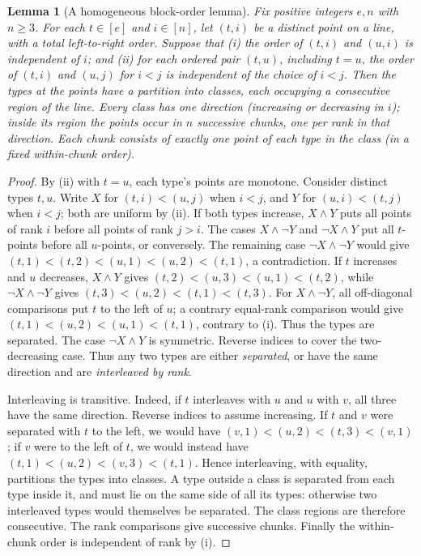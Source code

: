 \documentclass[11pt]{article}
\numberwithin{equation}{section}
\theoremstyle{plain}
\newtheorem{lemma}[theorem]{Lemma}
\theoremstyle{definition}
\theoremstyle{remark}
\theoremstyle{plain}
\begin{document}
\begin{lemma}[A homogeneous block-order lemma]
\label{lem:group-block-order-v82}
Fix positive integers $e,n$ with $n\ge3$.  For each
$t\in[e]$ and $i\in[n]$, let $(t,i)$ be a distinct point
on a line, with a total left-to-right order.  Suppose that
(i) the order of $(t,i)$ and $(u,i)$ is independent of $i$;
and (ii) for each ordered pair $(t,u)$, including $t=u$,
the order of $(t,i)$ and $(u,j)$ for $i<j$ is independent
of the choice of $i<j$.
Then the types at the points have a partition into classes,
each occupying a consecutive region of the line.  Every
class has one direction (increasing or decreasing in $i$);
inside its region the points occur in $n$ successive
\emph{chunks}, one per rank in that direction.  Each
chunk consists of exactly one point of each type in the
class (in a fixed within-chunk order).
\end{lemma}
\begin{proof}
By (ii) with $t=u$, each type's points are monotone.
Consider distinct types $t,u$.  Write
$X$ for $(t,i)<(u,j)$ when $i<j$, and $Y$ for
$(u,i)<(t,j)$ when $i<j$; both are uniform by (ii).
If both types increase, $X\wedge Y$ puts all points
of rank $i$ before all points of rank $j>i$.
The cases $X\wedge\neg Y$ and
$\neg X\wedge Y$ put all $t$-points before all
$u$-points, or conversely.  The remaining case
$\neg X\wedge\neg Y$ would give
$(t,1)<(t,2)<(u,1)<(u,2)<(t,1)$,
a contradiction.  If $t$ increases and $u$ decreases, $X\wedge Y$
gives $(t,2)<(u,3)<(u,1)<(t,2)$, while
$\neg X\wedge\neg Y$ gives
$(t,3)<(u,2)<(t,1)<(t,3)$.
For $X\wedge\neg Y$, all off-diagonal comparisons
put $t$ to the left of $u$; a contrary equal-rank
comparison would give
$(t,1)<(u,2)<(u,1)<(t,1)$,
contrary to (i).  Thus the types are separated.
The case $\neg X\wedge Y$ is symmetric.
Reverse indices
to cover the two-decreasing case.  Thus any two
types are either \emph{separated}, or have the
same direction and are \emph{interleaved by rank}.

Interleaving is transitive.  Indeed, if $t$ interleaves
with $u$ and $u$ with $v$, all three have the same
direction.  Reverse indices to assume increasing.
If $t$ and $v$ were separated with $t$ to the left,
we would have
$(v,1)<(u,2)<(t,3)<(v,1)$;
if $v$ were to the left of $t$, we would instead
have $(t,1)<(u,2)<(v,3)<(t,1)$.
Hence interleaving, with equality, partitions
the types into classes.  A type outside a class is
separated from each type inside it, and must lie
on the same side of all its types: otherwise two
interleaved types would themselves be separated.
The class regions are therefore consecutive.  The
rank comparisons give successive chunks.  Finally
the within-chunk order is independent of rank by (i).
\end{proof}
\end{document}
